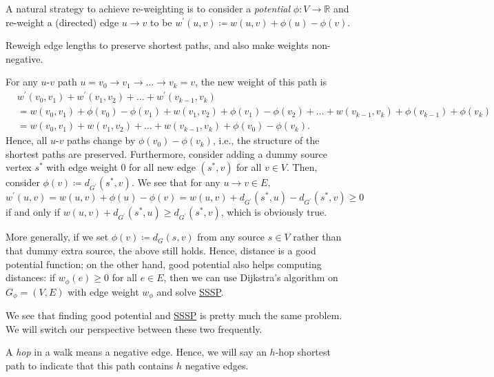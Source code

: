 \begin{prev}\label{prev:Johnson-algorithm}
	A natural strategy to achieve re-weighting is to consider a \emph{potential} \(\phi \colon V \to \mathbb{R} \) and re-weight a (directed) edge \(u \to v\) to be \(w^{\prime} (u, v)\coloneqq w(u, v) + \phi (u) - \phi (v)\).
	\begin{intuition}
		Reweigh edge lengths to preserve shortest paths, and also make weights non-negative.
	\end{intuition}
	For any \(u\)-\(v\) path \(u = v_0 \to v_1 \to \dots \to v_k = v\), the new weight of this path is
	\[
		\begin{split}
			 & w^{\prime} (v_0, v_1 ) + w^{\prime} (v_1, v_2) + \dots + w^{\prime} (v_{k-1}, v_k)                                                      \\
			 & = w(v_0, v_1) + \phi (v_0) - \phi (v_1) + w(v_1, v_2) + \phi (v_1) - \phi (v_2) + \dots + w(v_{k-1}, v_k) + \phi (v_{k-1}) + \phi (v_k) \\
			 & = w(v_0, v_1) + w(v_1, v_2) + \dots + w(v_{k-1}, v_{k}) + \phi (v_0) - \phi (v_k).
		\end{split}
	\]
	Hence, all \(u\)-\(v\) paths change by \(\phi (v_0) - \phi (v_k)\), i.e., the structure of the shortest paths are preserved. Furthermore, consider adding a dummy source vertex \(s^{\ast} \) with edge weight \(0\) for all new edge \((s^{\ast} , v)\) for all \(v \in V\). Then, consider \(\phi (v) \coloneqq d_{G^{\prime} }(s^{\ast} , v)\). We see that for any \(u \to v \in E\),
	\[
		w^{\prime} (u, v) = w(u, v) + \phi (u) - \phi (v) = w(u, v) + d_{G^{\prime} }(s^{\ast} , u) - d_{G^{\prime} }(s^{\ast} , v) \geq 0
	\]
	if and only if \(w(u, v) + d_{G^{\prime} }(s^{\ast} , u) \geq d_{G^{\prime} }(s^{\ast} , v)\), which is obviously true.

	\begin{center}
	\end{center}
	More generally, if we set \(\phi (v) \coloneqq d_G(s, v)\) from any source \(s \in V\) rather than that dummy extra source, the above still holds. Hence, distance is a good potential function; on the other hand, good potential also helps computing distances: if \(w_{\phi } (e) \geq 0\) for all \(e \in E\), then we can use Dijkstra's algorithm on \(G_{\phi } = (V, E)\) with edge weight \(w_{\phi }\) and solve \hyperref[prb:SSSP]{SSSP}.
\end{prev}

We see that finding good potential and \hyperref[prb:SSSP]{SSSP} is pretty much the same problem. We will switch our perspective between these two frequently.

\begin{notation}[Hop]\label{not:hop}
	A \emph{hop} in a walk means a negative edge. Hence, we will say an \(h\)-hop shortest path to indicate that this path contains \(h\) negative edges.
\end{notation}